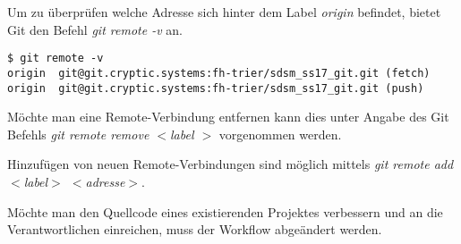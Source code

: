 Um zu überprüfen welche Adresse sich hinter dem Label \textit{origin} befindet, bietet Git den Befehl \textit{git remote -v} an.

\begin{verbatim}
$ git remote -v
origin  git@git.cryptic.systems:fh-trier/sdsm_ss17_git.git (fetch)
origin  git@git.cryptic.systems:fh-trier/sdsm_ss17_git.git (push)
\end{verbatim}
 
Möchte man eine Remote-Verbindung entfernen kann dies unter Angabe des Git Befehls \textit{git remote remove  $ < $label $ > $} vorgenommen werden. 
  
Hinzufügen von neuen Remote-Verbindungen sind möglich mittels \textit{git remote add $ < $label$ > $ $ < $adresse$ > $}.

\begin{INFO}
  Möchte man den Quellcode eines existierenden Projektes verbessern und an die Verantwortlichen einreichen, muss der Workflow abgeändert werden.
  
  
\end{INFO}